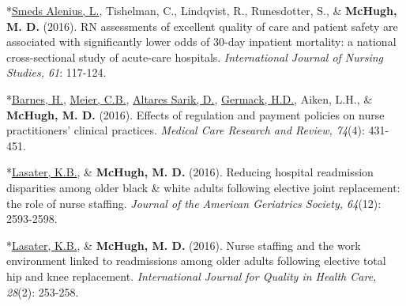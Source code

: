 \documentclass[10pt,]{article}
\begin{document}
{{{{{{{{{{{{{{\begin{hangparas}{.25in}{1}
*{\underline {Smeds Alenius, L.}}, Tishelman, C., Lindqvist, R., Runesdotter, S., \& {\textbf {McHugh, M. D.}} (2016). RN assessments of excellent quality of care and patient safety are associated with significantly lower odds of 30-day inpatient mortality: a national cross-sectional study of acute-care hospitals. {\textit {International Journal of Nursing Studies, 61}}: 117-124.

\end{hangparas}

\vspace{4mm}

\begin{hangparas}{.25in}{1}

*{\underline {Barnes, H.}}, {\underline {Meier, C.B.}}, {\underline {Altares Sarik, D.}}, {\underline {Germack, H.D.}}, Aiken, L.H., \& {\textbf {McHugh, M. D.}} (2016). Effects of regulation and payment policies on nurse practitioners' clinical practices. {\textit {Medical Care Research and Review, 74}}(4): 431-451.

\end{hangparas}

\vspace{4mm}

\begin{hangparas}{.25in}{1}

*{\underline {Lasater, K.B.}}, \& {\textbf {McHugh, M. D.}} (2016). Reducing hospital readmission disparities among older black \& white adults following elective joint replacement: the role of nurse staffing. {\textit {Journal of the American Geriatrics Society, 64}}(12): 2593-2598.

\end{hangparas}

\vspace{4mm}

\begin{hangparas}{.25in}{1}

*{\underline {Lasater, K.B.}}, \& {\textbf {McHugh, M. D.}} (2016). Nurse staffing and the work environment linked to readmissions among older adults following elective total hip and knee replacement. {\textit {International Journal for Quality in Health Care, 28}}(2): 253-258.

\end{hangparas}

\vspace{4mm}

\begin{hangparas}{.25in}{1}


\end{hangparas}}}}}}}}}}}}}}}
\end{document}
